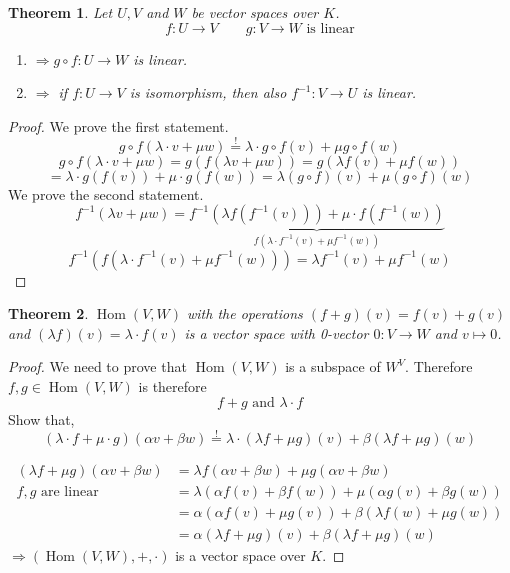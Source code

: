 \documentclass[a4paper,landscape,twocolumn]{article}
\newtheorem{theorem}{Theorem}
\DeclareMathOperator\Hom{Hom} %
\begin{document}
\begin{theorem}
  Let $U, V$ and $W$ be vector spaces over $K$.
  \[ f: U \rightarrow V \qquad g: V \rightarrow W \text{ is linear} \]
  \begin{enumerate}
    \item $\Rightarrow g \circ f: U \rightarrow W$ is linear.
    \item $\Rightarrow$ if $f: U \rightarrow V$ is isomorphism,
      then also $f^{-1}: V \rightarrow U$ is linear.
  \end{enumerate}
\end{theorem}
\begin{proof}
  We prove the first statement.
  \[ g \circ f (\lambda \cdot v + \mu w) \stackrel{!}{=} \lambda \cdot g \circ f(v) + \mu g \circ f(w) \]
  \[ g \circ f (\lambda \cdot v + \mu w) = g(f(\lambda v + \mu w)) = g(\lambda f(v) + \mu f(w)) \]
  \[ = \lambda \cdot g(f(v)) + \mu \cdot g(f(w)) = \lambda (g \circ f) (v) + \mu (g \circ f) (w) \]
  We prove the second statement.
  \[ f^{-1}(\lambda v + \mu w) = \underbrace{f^{-1}(\lambda f(f^{-1}(v))) + \mu \cdot f(f^{-1}(w))}_{f(\lambda \cdot f^{-1}(v) + \mu f^{-1}(w))} \]
  \[ f^{-1}(f(\lambda \cdot f^{-1}(v) + \mu f^{-1}(w))) = \lambda f^{-1}(v) + \mu f^{-1}(w) \]
\end{proof}

\begin{theorem}
  \label{satz-5-7}
  $\Hom(V, W)$ with the operations $(f + g)(v) = f(v) + g(v)$
  and $(\lambda f)(v) = \lambda \cdot f(v)$ is a vector space with 0-vector $0: V \rightarrow W$ and $v \mapsto 0$.
\end{theorem}
\begin{proof}
  We need to prove that $\Hom(V, W)$ is a subspace of $W^V$.
  Therefore $f, g \in \Hom(V, W)$ is therefore
  \[ f + g \text{ and } \lambda \cdot f \]
  Show that,
  \[ (\lambda \cdot f + \mu \cdot g) (\alpha v + \beta w) \stackrel{!}{=} \lambda \cdot (\lambda f + \mu g) (v) + \beta (\lambda f + \mu g) (w) \]

  \begin{align*}
    (\lambda f + \mu g) (\alpha v + \beta w) &= \lambda f(\alpha v + \beta w) + \mu g(\alpha v + \beta w) \\
    f, g \text{ are linear } &= \lambda (\alpha f(v) + \beta f(w)) + \mu (\alpha g(v) + \beta g(w)) \\
      &= \alpha \left(\alpha f(v) + \mu g(v)\right) + \beta(\lambda f(w) + \mu g(w)) \\
      &= \alpha (\lambda f + \mu g)(v) + \beta (\lambda f + \mu g)(w)
  \end{align*}
  $\Rightarrow (\Hom(V, W), +, \cdot)$ is a vector space over $K$.
\end{proof}
\end{document}
